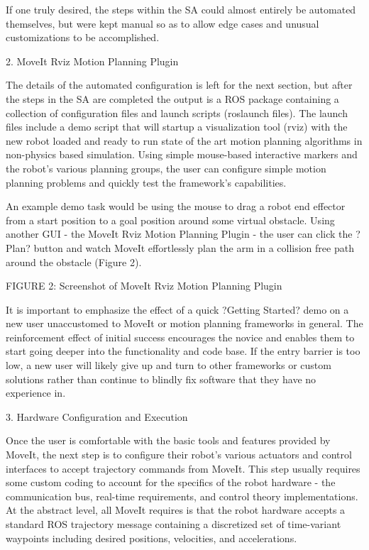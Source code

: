 \documentclass[10pt,journal,compsoc]{joser1}
\begin{document}
{If one truly desired, the steps within the SA could almost entirely be automated themselves, but were kept manual so as to allow edge cases and unusual customizations to be accomplished.

2. MoveIt Rviz Motion Planning Plugin

The details of the automated configuration is left for the next section, but after the steps in the SA are completed the output is a ROS package containing a collection of configuration files and launch scripts (roslaunch files). The launch files include a demo script that will startup a visualization tool (rviz) with the new robot loaded and ready to run state of the art motion planning algorithms in non-physics based simulation. Using simple mouse-based interactive markers and the robot's various planning groups, the user can configure simple motion planning problems and quickly test the framework's capabilities.  

An example demo task would be using the mouse to drag a robot end effector from a start position to a goal position around some virtual obstacle. Using another GUI - the MoveIt Rviz Motion Planning Plugin - the user can click the ?Plan? button and watch MoveIt effortlessly plan the arm in a collision free path around the obstacle (Figure 2).

FIGURE 2: Screenshot of MoveIt Rviz Motion Planning Plugin

It is important to emphasize the effect of a quick ?Getting Started? demo on a new user unaccustomed to MoveIt or motion planning frameworks in general. The reinforcement effect of initial success encourages the novice and enables them to start going deeper into the functionality and code base. If the entry barrier is too low, a new user will likely give up and turn to other frameworks or custom solutions rather than continue to blindly fix software that they have no experience in.

3. Hardware Configuration and Execution

Once the user is comfortable with the basic tools and features provided by MoveIt, the next step is to configure their robot's various actuators and control interfaces to accept trajectory commands from MoveIt. This step usually requires some custom coding to account for the specifics of the robot hardware - the communication bus, real-time requirements, and control theory implementations. At the abstract level, all MoveIt requires is that the robot hardware accepts a standard ROS trajectory message containing a discretized set of time-variant waypoints including desired positions, velocities, and accelerations. 

}
\end{document}
